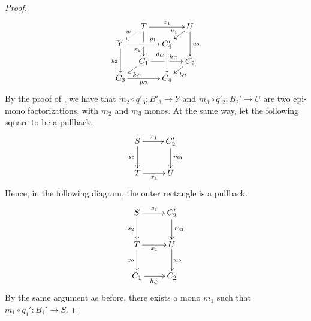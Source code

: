 \documentclass[a4paper,UKenglish,cleveref,pdftex,thm-restate,numberwithinsect]{lipics-v2021}
\def\C{\textbf {\textup{C}}}
\def\T{\textbf {\textup{1}}}
\begin{document}
\begin{proof}
	\[\xymatrix@C=10pt@R=6pt{&T\ar[dd]|\hole_(.65){x_2}\ar[rr]^{x_1} \ar@{.>}[dl]_{w} && U \ar[dd]^{u_2} \ar[dl]_{u_1} \\ Y  \ar[dd]_{y_2}\ar[rr]^(.7){y_1} & & C_4' \ar[dd]_(.3){d_C}\\&C_1\ar[rr]|\hole^(.65){h_C} \ar[dl]^{k_C} && C_2 \ar[dl]^{t_C} \\C_3 \ar[rr]_{p_C} & & C_4 }\]
	By the proof of , we have that $m_2 \circ q'_3 : B'_3 \to Y$ and $m_3 \circ q'_2 : B_2' \to U$ are two epi-mono factorizations, with $m_2$ and $m_3$ monos.
	At the same way, let the following square to be a pullback.
	\[\xymatrix{S\ar[r]^{s_1}\ar[d]_{s_2}&C'_2\ar[d]^{m_3}\\T\ar[r]_{x_1}&U}\]
	Hence, in the following diagram, the outer rectangle is a pullback.
	\[\xymatrix{
		S\ar[r]^{s_1}\ar[d]_{s_2}&C'_2\ar[d]^{m_3}\\T\ar[r]_{x_1}\ar[d]_{x_2}&U\ar[d]^{u_2}\\C_1\ar[r]_{h_C}&C_2
	}\]
	By the same argument as before, there exists a mono $m_1$ such that $m_1\circ q_1' : B_1' \to S$.
	

\end{proof}
\end{document}
